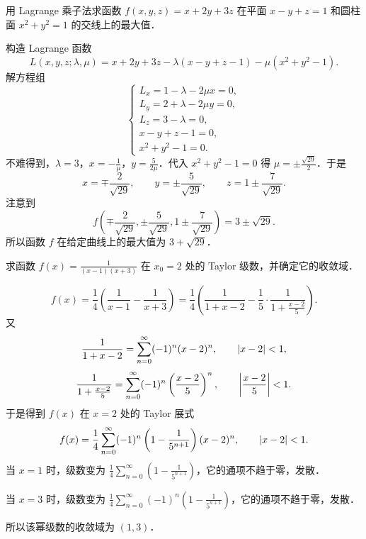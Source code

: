 用 Lagrange 乘子法求函数 $f(x,y,z)=x+2y+3z$ 在平面 $x-y+z=1$ 和圆柱面 $x^2+y^2=1$ 的交线上的最大值．
\begin{solution}
构造 Lagrange 函数
\[
  L(x,y,z;\lambda,\mu)=x+2y+3z-\lambda(x-y+z-1)-\mu(x^2+y^2-1).
\]
解方程组
\[
  \begin{cases}
    L_x=1-\lambda-2\mu x=0,\\
    L_y=2+\lambda-2\mu y=0,\\
    L_z=3-\lambda=0,\\
    x-y+z-1=0,\\
    x^2+y^2-1=0.
  \end{cases}
\]
不难得到，$\lambda=3$，$x=-\frac{1}{\mu}$，$y=\frac{5}{2\mu}$．代入 $x^2+y^2-1=0$ 得 $\mu=\pm\frac{\sqrt{29}}{2}$．于是
\[
  x=\mp\frac{2}{\sqrt{29}},\qquad
  y=\pm\frac{5}{\sqrt{29}},\qquad
  z=1\pm\frac{7}{\sqrt{29}}.
\]
注意到
\[
  f\left(\mp\frac{2}{\sqrt{29}},\pm\frac{5}{\sqrt{29}},1\pm\frac{7}{\sqrt{29}}\right)=3\pm\sqrt{29}.
\]
所以函数 $f$ 在给定曲线上的最大值为 $3+\sqrt{29}$．
\end{solution}

求函数 $\displaystyle f(x)=\frac{1}{(x-1)(x+3)}$ 在 $x_0=2$ 处的 Taylor 级数，并确定它的收敛域．
\begin{solution}
\[
  f(x)=\frac{1}{4}\left(\frac{1}{x-1}-\frac{1}{x+3}\right)
  =\frac{1}{4}\left(\frac{1}{1+x-2}-\frac{1}{5}\cdot\frac{1}{1+\frac{x-2}{5}}\right).
\]
又
\[
  \frac{1}{1+x-2}=\sum_{n=0}^{\infty}(-1)^n(x-2)^n,\qquad \left|x-2\right|<1,
\]
\[
  \frac{1}{1+\frac{x-2}{5}}=\sum_{n=0}^{\infty}(-1)^n\left(\frac{x-2}{5}\right)^n,\qquad \left|\frac{x-2}{5}\right|<1.
\]
于是得到 $f(x)$ 在 $x=2$ 处的 Taylor 展式
\[
  f(x)=\frac{1}{4}\sum_{n=0}^{\infty}(-1)^n\left(1-\frac{1}{5^{n+1}}\right)(x-2)^n,\qquad \left|x-2\right|<1.
\]
当 $x=1$ 时，级数变为 $\frac{1}{4}\sum_{n=0}^{\infty}\left(1-\frac{1}{5^{n+1}}\right)$，它的通项不趋于零，发散．

当 $x=3$ 时，级数变为 $\frac{1}{4}\sum_{n=0}^{\infty}(-1)^n\left(1-\frac{1}{5^{n+1}}\right)$，它的通项不趋于零，发散．

所以该幂级数的收敛域为 $(1,3)$．
\end{solution}


